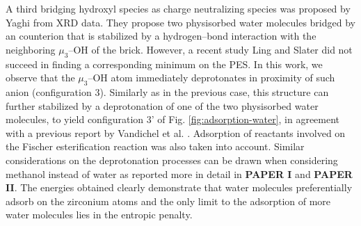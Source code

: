 A third bridging hydroxyl species as charge neutralizing species was proposed by Yaghi \cite{trickett2015definitive} from XRD data. They propose two physisorbed water molecules bridged by an  counterion that is stabilized by a hydrogen--bond interaction with the neighboring $\mu_3$--OH of the brick. However, a recent study Ling and Slater \cite{ling2016dynamic} did not succeed in finding a corresponding minimum on the PES. In this work, we observe that the $\mu_3$--OH atom immediately deprotonates in proximity of such  anion (configuration 3). Similarly as in the previous case, this structure can further stabilized by a deprotonation of one of the two physisorbed water molecules, to yield configuration 3’ of Fig. \ref{fig:adsorption-water}, in agreement with a previous report by Vandichel et al. \cite{vandichel2016water}. Adsorption of reactants involved on the Fischer esterification reaction was also taken into account. Similar considerations on the deprotonation processes can be drawn when considering methanol instead of water as reported more in detail in \textbf{PAPER I} and \textbf{PAPER II}. The energies obtained clearly demonstrate that water molecules preferentially adsorb on the zirconium atoms and the only limit to the adsorption of more water molecules lies in the entropic penalty. 

